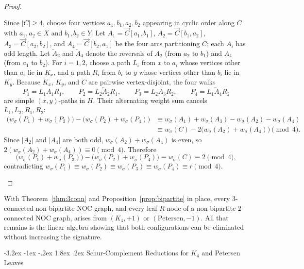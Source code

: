 \documentclass[10pt,letterpaper]{article}
\makeatletter
\renewcommand\section{\@startsection{section}{1}{\z@}%
  {-3.2ex \@plus -1ex \@minus -.2ex}%
  {1.8ex \@plus .2ex}%
  {\normalfont\large\bfseries}}
\theoremstyle{zetaplain}
\theoremstyle{zetadef}
\theoremstyle{remark}
\numberwithin{equation}{section}
\newcommand{\vecC}[1]{\overrightarrow{#1}}
\newcommand{\revC}[1]{\overleftarrow{#1}}
\makeatother
\begin{document}
\begin{proof}
\begin{itemize}
  Since $|C| \ge 4$, choose four vertices $a_1, b_1, a_2, b_2$ appearing in cyclic order along $C$ with $a_1, a_2 \in X$ and $b_1, b_2 \in Y$. Let $A_1 = \vecC{C}[a_1, b_1]$, $A_2 = \vecC{C}[b_1, a_2]$, $A_3 = \vecC{C}[a_2, b_2]$, and $A_4 = \vecC{C}[b_2, a_1]$ be the four arcs partitioning $C$; each $A_i$ has odd length. Let $\revC{A}_2$ and $\revC{A}_4$ denote the reversals of $A_2$ (from $a_2$ to $b_1$) and $A_4$ (from $a_1$ to $b_2$). For $i = 1, 2$, choose a path $L_i$ from $x$ to $a_i$ whose vertices other than $a_i$ lie in $K_x$, and a path $R_i$ from $b_i$ to $y$ whose vertices other than $b_i$ lie in $K_y$. Because $K_x$, $K_y$, and $C$ are pairwise vertex-disjoint, the four walks
  \[
    P_1 = L_1 A_1 R_1, \qquad P_2 = L_2 \revC{A}_2 R_1, \qquad P_3 = L_2 A_3 R_2, \qquad P_4 = L_1 \revC{A}_4 R_2
  \]
  are simple $(x, y)$-paths in $H$. Their alternating weight sum cancels $L_1, L_2, R_1, R_2$:
  \begin{align*}
    \bigl(w_\sigma(P_1) + w_\sigma(P_3)\bigr) - \bigl(w_\sigma(P_2) + w_\sigma(P_4)\bigr)
    &\equiv w_\sigma(A_1) + w_\sigma(A_3) - w_\sigma(A_2) - w_\sigma(A_4) \\
    &\equiv w_\sigma(C) - 2\bigl(w_\sigma(A_2) + w_\sigma(A_4)\bigr) \pmod 4.
  \end{align*}
  Since $|A_2|$ and $|A_4|$ are both odd, $w_\sigma(A_2) + w_\sigma(A_4)$ is even, so $2(w_\sigma(A_2) + w_\sigma(A_4)) \equiv 0 \pmod 4$. Therefore
  \[
    \bigl(w_\sigma(P_1) + w_\sigma(P_3)\bigr) - \bigl(w_\sigma(P_2) + w_\sigma(P_4)\bigr) \equiv w_\sigma(C) \equiv 2 \pmod 4,
  \]
  contradicting $w_\sigma(P_1) \equiv w_\sigma(P_2) \equiv w_\sigma(P_3) \equiv w_\sigma(P_4) \equiv r \pmod 4$. \qedhere
\end{itemize}
\end{proof}

With Theorem~\ref{thm:3conn} and Proposition~\ref{prop:bipartite} in place, every $3$-connected non-bipartite NOC graph, and every leaf $R$-node of a non-bipartite $2$-connected NOC graph, arises from $(K_4, +1)$ or $(\mathrm{Petersen}, -1)$. All that remains is the linear algebra showing that both configurations can be eliminated without increasing the signature.

\section{Schur-Complement Reductions for \texorpdfstring{$K_4$}{K4} and Petersen Leaves}\label{sec:schur}
\end{document}
